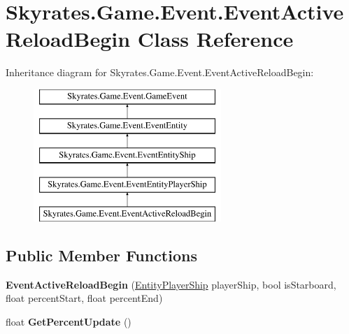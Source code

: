 \hypertarget{class_skyrates_1_1_game_1_1_event_1_1_event_active_reload_begin}{\section{Skyrates.\-Game.\-Event.\-Event\-Active\-Reload\-Begin Class Reference}
\label{class_skyrates_1_1_game_1_1_event_1_1_event_active_reload_begin}
}
Inheritance diagram for Skyrates.\-Game.\-Event.\-Event\-Active\-Reload\-Begin\-:\begin{figure}[H]
\begin{center}
\leavevmode
\includegraphics[height=5.000000cm]{class_skyrates_1_1_game_1_1_event_1_1_event_active_reload_begin}
\end{center}
\end{figure}
\subsection*{Public Member Functions}
\begin{DoxyCompactItemize}
\item 
\hypertarget{class_skyrates_1_1_game_1_1_event_1_1_event_active_reload_begin_a2deb95e1798b3be2309f0a21dfb991d2}{{\bfseries Event\-Active\-Reload\-Begin} (\hyperlink{class_skyrates_1_1_entity_1_1_entity_player_ship}{Entity\-Player\-Ship} player\-Ship, bool is\-Starboard, float percent\-Start, float percent\-End)}\label{class_skyrates_1_1_game_1_1_event_1_1_event_active_reload_begin_a2deb95e1798b3be2309f0a21dfb991d2}

\item 
\hypertarget{class_skyrates_1_1_game_1_1_event_1_1_event_active_reload_begin_a8f3a856b97270b8fb44ebd8f9d6fc4f4}{float {\bfseries Get\-Percent\-Update} ()}\label{class_skyrates_1_1_game_1_1_event_1_1_event_active_reload_begin_a8f3a856b97270b8fb44ebd8f9d6fc4f4}

\end{DoxyCompactItemize}
